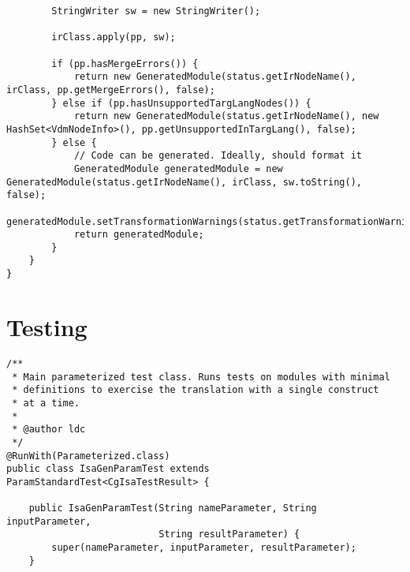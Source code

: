 \begin{appendices}
\begin{lstlisting}
        StringWriter sw = new StringWriter();

        irClass.apply(pp, sw);

        if (pp.hasMergeErrors()) {
            return new GeneratedModule(status.getIrNodeName(), irClass, pp.getMergeErrors(), false);
        } else if (pp.hasUnsupportedTargLangNodes()) {
            return new GeneratedModule(status.getIrNodeName(), new HashSet<VdmNodeInfo>(), pp.getUnsupportedInTargLang(), false);
        } else {
            // Code can be generated. Ideally, should format it
            GeneratedModule generatedModule = new GeneratedModule(status.getIrNodeName(), irClass, sw.toString(), false);
            generatedModule.setTransformationWarnings(status.getTransformationWarnings());
            return generatedModule;
        }
    }
}
\end{lstlisting}



\chapter{Testing} \label{testing}
\begin{lstlisting}
/**
 * Main parameterized test class. Runs tests on modules with minimal
 * definitions to exercise the translation with a single construct
 * at a time.
 *
 * @author ldc
 */
@RunWith(Parameterized.class)
public class IsaGenParamTest extends ParamStandardTest<CgIsaTestResult> {

    public IsaGenParamTest(String nameParameter, String inputParameter,
                           String resultParameter) {
        super(nameParameter, inputParameter, resultParameter);
    }


\end{lstlisting}
\end{appendices}
